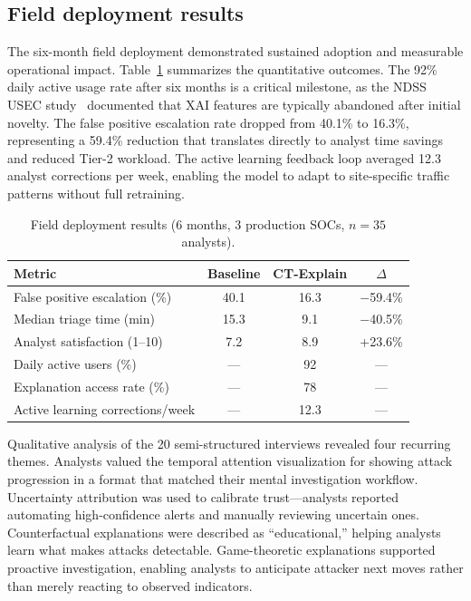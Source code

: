 \documentclass[preprint,review,12pt]{elsarticle}
\begin{document}
\subsection{Field deployment results}

The six-month field deployment demonstrated sustained adoption and measurable operational impact. Table~\ref{tab:field_results} summarizes the quantitative outcomes. The 92\% daily active usage rate after six months is a critical milestone, as the NDSS USEC study~\cite{ndss_usec_2022} documented that XAI features are typically abandoned after initial novelty. The false positive escalation rate dropped from 40.1\% to 16.3\%, representing a 59.4\% reduction that translates directly to analyst time savings and reduced Tier-2 workload. The active learning feedback loop averaged 12.3 analyst corrections per week, enabling the model to adapt to site-specific traffic patterns without full retraining.

\begin{table}[!t]
\centering
\caption{Field deployment results (6 months, 3 production SOCs, $n = 35$ analysts).}
\label{tab:field_results}
\begin{tabular}{@{}lccc@{}}
\toprule
\textbf{Metric} & \textbf{Baseline} & \textbf{CT-Explain} & \textbf{$\Delta$} \\
\midrule
False positive escalation (\%) & 40.1 & 16.3 & $-$59.4\% \\
Median triage time (min) & 15.3 & 9.1 & $-$40.5\% \\
Analyst satisfaction (1--10) & 7.2 & 8.9 & +23.6\% \\
Daily active users (\%) & --- & 92 & --- \\
Explanation access rate (\%) & --- & 78 & --- \\
Active learning corrections/week & --- & 12.3 & --- \\
\bottomrule
\end{tabular}
\end{table}

Qualitative analysis of the 20 semi-structured interviews revealed four recurring themes. Analysts valued the temporal attention visualization for showing attack progression in a format that matched their mental investigation workflow. Uncertainty attribution was used to calibrate trust---analysts reported automating high-confidence alerts and manually reviewing uncertain ones. Counterfactual explanations were described as ``educational,'' helping analysts learn what makes attacks detectable. Game-theoretic explanations supported proactive investigation, enabling analysts to anticipate attacker next moves rather than merely reacting to observed indicators.
\end{document}
